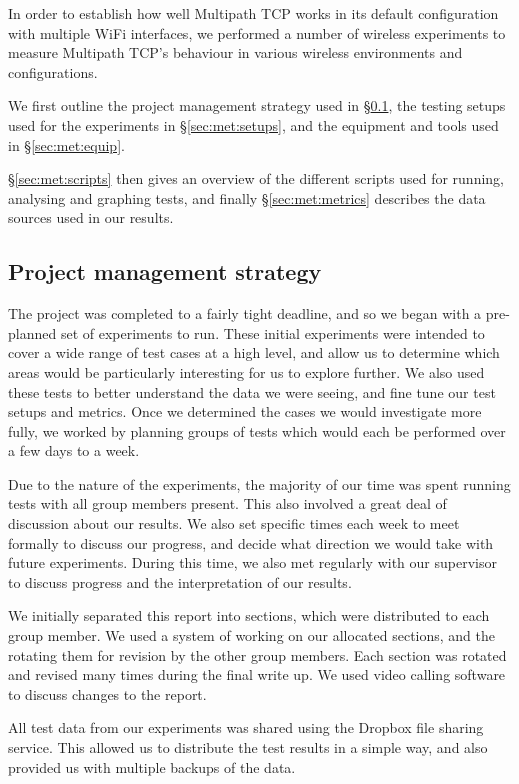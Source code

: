 In order to establish how well Multipath TCP works in its default configuration
with multiple WiFi interfaces, we performed a number of wireless experiments to
measure Multipath TCP's behaviour in various wireless environments and
configurations.

We first outline the project management strategy used in \S\ref{sec:met:pm}, 
the testing setups used for the experiments in \S\ref{sec:met:setups}, 
and the equipment and tools used in \S\ref{sec:met:equip}.

\S\ref{sec:met:scripts} then gives an overview of the different scripts used for
running, analysing and graphing tests, and finally \S\ref{sec:met:metrics}
describes the data sources used in our results.

\subsection{Project management strategy}
\label{sec:met:pm}
The project was completed to a fairly tight deadline, and so we began with a
pre-planned set of experiments to run. These initial experiments were intended
to cover a wide range of test cases at a high level, and allow us to determine
which areas would be particularly interesting for us to explore further.
We also used these tests to better understand the data we were seeing, and
fine tune our test setups and metrics. Once we determined the cases we would
investigate more fully, we worked by planning groups of tests which would
each be performed over a few days to a week.

Due to the nature of the experiments, the majority of our time was spent
running tests with all group members present. This also involved a great
deal of discussion about our results. We also set specific times each week to
meet formally to discuss our progress, and decide what direction we would
take with future experiments. During this time, we also met regularly with
our supervisor to discuss progress and the interpretation of our results.

We initially separated this report into sections, which were distributed to
each group member. We used a system of working on our allocated sections, and
the rotating them for revision by the other group members. Each section was
rotated and revised many times during the final write up. We used video
calling software to discuss changes to the report.

All test data from our experiments was shared using the Dropbox file sharing
service. This allowed us to distribute the test results in a simple way, and
also provided us with multiple backups of the data.

